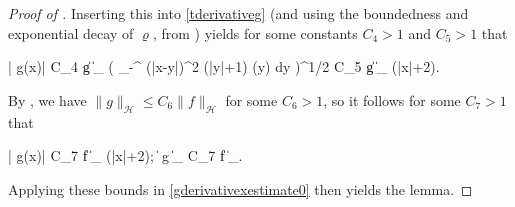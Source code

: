 \documentclass[10pt,a4paper]{amsart}
\begin{document}
\begin{proof}[Proof of ]
		\noindent Inserting this into \eqref{tderivativeg} (and using the boundedness and exponential decay of $\varrho$, from ) yields for some constants $C_4 > 1$ and $C_5 > 1$ that
		\begin{flalign*} 
			| g(x)| \le C_4 \| g \|_{} \cdot \Bigg( \displaystyle\int_{-\infty}^{\infty} (\log |x-y|)^2 (|y|+1) \varrho (y) dy \Bigg)^{1/2} \le C_5 \| g \|_{} \cdot \log (|x|+2).
		\end{flalign*} 
		
		\noindent By , we have $\| g \|_{\mathcal{H}} \le C_6 \| f \|_{\mathcal{H}}$ for some $C_6 > 1$, so it follows for some $C_7 > 1$ that 
		\begin{flalign*}
			| g(x)| \le C_7 \| f \|_{} \cdot \log (|x|+2); \qquad	\|  g \|_{} \le C_7 \| f \|_{\mathcal{H}}.
		\end{flalign*}
		
		\noindent Applying these bounds in \eqref{gderivativexestimate0} then yields the lemma.
	\end{proof} 
\end{document}
